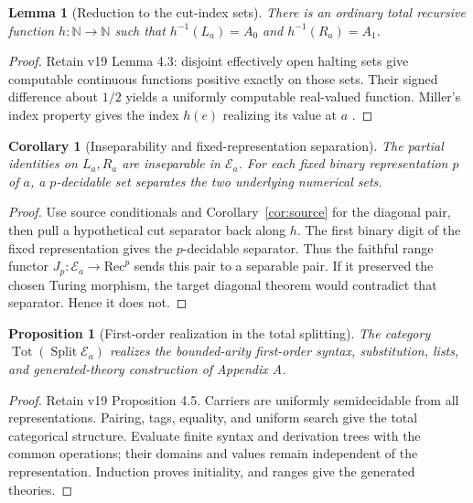 \documentclass[11pt]{article}
\newtheorem{lemma}[theorem]{Lemma}
\newtheorem{proposition}[theorem]{Proposition}
\newtheorem{corollary}[theorem]{Corollary}
\theoremstyle{definition}\newtheorem{definition}[theorem]{Definition}
\newcommand{\N}{\mathbb N}
\newcommand{\Tot}{\operatorname{Tot}}
\newcommand{\Split}{\operatorname{Split}}
\newcommand{\E}{\mathcal E}
\begin{document}
\begin{lemma}[Reduction to the cut-index sets]\label{lem:miller-cuts}
There is an ordinary total recursive function $h:\N\to\N$ such
that $h^{-1}(L_a)=A_0$ and $h^{-1}(R_a)=A_1$.
\end{lemma}
\begin{proof}
Retain v19 Lemma 4.3: disjoint effectively open halting sets give
computable continuous functions positive exactly on those sets.
Their signed difference about $1/2$ yields a uniformly computable
real-valued function. Miller's index property gives the index $h(e)$
realizing its value at $a$ \cite{Miller}.
\end{proof}

\begin{corollary}[Inseparability and fixed-representation separation]\label{cor:miller-cuts}
The partial identities on $L_a,R_a$ are inseparable in $\E_a$.
For each fixed binary representation $p$ of $a$, a $p$-decidable
set separates the two underlying numerical sets.
\end{corollary}
\begin{proof}
Use source conditionals and Corollary~\ref{cor:source} for the
diagonal pair, then pull a hypothetical cut separator back along
$h$. The first binary digit of the fixed representation gives the
$p$-decidable separator. Thus the faithful range functor
$J_p:\E_a\to\mathrm{Rec}^{p}$ sends this pair to a separable
pair. If it preserved the chosen Turing morphism, the target
diagonal theorem would contradict that separator. Hence it does not.
\end{proof}

\begin{proposition}[First-order realization in the total splitting]\label{prop:miller-realization}
The category $\Tot(\Split\E_a)$ realizes the bounded-arity
first-order syntax, substitution, lists, and generated-theory
construction of Appendix A.
\end{proposition}
\begin{proof}
Retain v19 Proposition 4.5. Carriers are uniformly semidecidable
from all representations. Pairing, tags, equality, and uniform
search give the total categorical structure. Evaluate finite syntax
and derivation trees with the common operations; their domains and
values remain independent of the representation. Induction proves
initiality, and ranges give the generated theories.
\end{proof}
\end{document}
